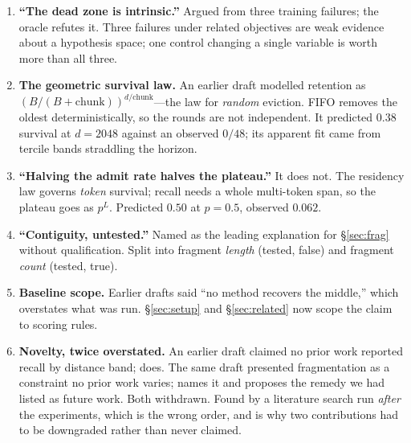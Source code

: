 \documentclass[10pt]{article}
\begin{document}
\begin{enumerate}\itemsep2pt
\item \textbf{``The dead zone is intrinsic.''} Argued from three training
      failures; the oracle refutes it. Three failures under related objectives
      are weak evidence about a hypothesis space; one control changing a single
      variable is worth more than all three.
\item \textbf{The geometric survival law.} An earlier draft modelled retention
      as $(B/(B+\text{chunk}))^{d/\text{chunk}}$---the law for \emph{random}
      eviction. FIFO removes the oldest deterministically, so the rounds are
      not independent. It predicted $0.38$ survival at $d{=}2048$ against an
      observed $0/48$; its apparent fit came from tercile bands straddling the
      horizon.
\item \textbf{``Halving the admit rate halves the plateau.''} It does not. The
      residency law governs \emph{token} survival; recall needs a whole
      multi-token span, so the plateau goes as $p^L$. Predicted $0.50$ at
      $p{=}0.5$, observed $0.062$.
\item \textbf{``Contiguity, untested.''} Named as the leading explanation for
      \S\ref{sec:frag} without qualification. Split into fragment \emph{length}
      (tested, false) and fragment \emph{count} (tested, true).
\item \textbf{Baseline scope.} Earlier drafts said ``no method recovers the
      middle,'' which overstates what was run. \S\ref{sec:setup} and
      \S\ref{sec:related} now scope the claim to scoring rules.
\item \textbf{Novelty, twice overstated.} An earlier draft claimed no prior work
      reported recall by distance band; \citet{indexmem2026} does. The same
      draft presented fragmentation as a constraint no prior work varies;
      \citet{yang2026ams} names it and proposes the remedy we had listed as
      future work. Both withdrawn. Found by a literature search run
      \emph{after} the experiments, which is the wrong order, and is why two
      contributions had to be downgraded rather than never claimed.
\end{enumerate}



\end{document}
